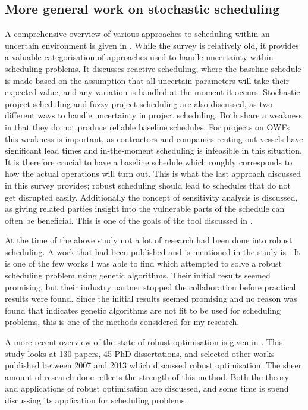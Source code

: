\documentclass[a4paper,12pt]{article}
\begin{document}
\subsection{More general work on stochastic scheduling} \label{ss:stoch}
A comprehensive overview of various approaches to scheduling within an uncertain environment is given in \cite{herroelen2005project}. While the survey is relatively old, it provides a valuable categorisation of approaches used to handle uncertainty within scheduling problems. It discusses reactive scheduling, where the baseline schedule is made based on the assumption that all uncertain parameters will take their expected value, and any variation is handled at the moment it occurs. Stochastic project scheduling and fuzzy project scheduling are also discussed, as two different ways to handle uncertainty in project scheduling. Both share a weakness in that they do not produce reliable baseline schedules. For projects on OWFs this weakness is important, as contractors and companies renting out vessels have significant lead times and in-the-moment scheduling is infeasible in this situation. It is therefore crucial to have a baseline schedule which roughly corresponds to how the actual operations will turn out. This is what the last approach discussed in this survey provides; robust scheduling should lead to schedules that do not get disrupted easily. Additionally the concept of sensitivity analysis is discussed, as giving related parties insight into the vulnerable parts of the schedule can often be beneficial. This is one of the goals of the tool discussed in . 

At the time of the above study not a lot of research had been done into robust scheduling. A work that had been published and is mentioned in the study is \cite{sevaux2002genetic}. It is one of the few works I was able to find which attempted to solve a robust scheduling problem using genetic algorithms. Their initial results seemed promising, but their industry partner stopped the collaboration before practical results were found. Since the initial results seemed promising and no reason was found that indicates genetic algorithms are not fit to be used for scheduling problems, this is one of the methods considered for my research.

\bigskip

A more recent overview of the state of robust optimisation is given in \cite{gabrel2014recent}. This study looks at 130 papers, 45 PhD dissertations, and selected other works published between 2007 and 2013 which discussed robust optimisation. The sheer amount of research done reflects the strength of this method. Both the theory and applications of robust optimisation are discussed, and some time is spend discussing its application for scheduling problems. 
\end{document}
